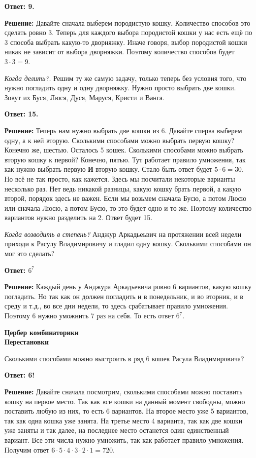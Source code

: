 \textbf{Ответ: 9.}

\textbf{Решение:} Давайте сначала выберем породистую кошку. Количество способов это сделать ровно 3. Теперь для каждого выбора породистой кошки у нас есть ещё по 3 способа выбрать какую-то дворняжку. Иначе говоря, выбор породистой кошки никак не зависит от выбора дворняжки. Поэтому количество способов будет $3\cdot 3=9$. 

\textit{Когда делить?.} Решим ту же самую задачу, только теперь без условия того, что нужно погладить одну и одну дворняжку. Нужно просто выбрать две кошки. Зовут их Буся, Люся, Дуся, Маруся, Кристи и Ванга.

\textbf{Ответ: 15.}

\textbf{Решение:} Теперь нам нужно выбрать две кошки из 6. Давайте сперва выберем одну, а к ней вторую. Сколькими способами можно выбрать первую кошку? Конечно же, шестью. Осталось 5 кошек. Сколькими способами можно выбрать вторую кошку к первой? Конечно, пятью. Тут работает правило умножения, так как нужно выбрать первую \textbf{И} вторую кошку. Стало быть ответ будет $5 \cdot 6 = 30$. Но всё не так просто, как кажется. Здесь мы посчитали некоторые варианты несколько раз. Нет ведь никакой разницы, какую кошку брать первой, а какую второй, порядок здесь не важен. Если мы возьмем сначала Бусю, а потом Люсю или сначала Люсю, а потом Бусю, то это будет одно и то же. Поэтому количество вариантов нужно разделить на 2. Ответ будет 15.

\textit{Когда возводить в степень?} Анджур Аркадьеьвич на протяжении всей недели приходи к Расулу Владимировичу и гладил одну кошку. Сколькими способами он мог это сделать? 

\textbf{Ответ: $6^7$}

\textbf{Решение:} Каждый день у Анджура Аркадьевича ровно 6 вариантов, какую кошку погладить. Но так как он должен погладить и в понедельник, и во вторник, и в среду и т.д., во все дни недели, то здесь срабатывает правило умножения. Поэтому 6 нужно уможнить 7 раз на себя. То есть ответ $6^7$.
\newpage

\textbf{\Large Цербер комбинаторики}\\

\textbf{\large Перестановки}

Сколькими способами можно выстроить в ряд 6 кошек Расула Владимировича?

\textbf{Ответ: 6!}

\textbf{Решение:} Давайте сначала посмотрим, сколькими способами можно поставить кошку на первое место. Так как все кошки на данный момент свободны, можно поставить любую из них, то есть 6 вариантов. На второе место уже 5 вариантов, так как одна кошка уже занята. На третье место 4 варианта, так как две кошки уже заняты и так далее, на последнее место останется один единственный вариант. Все эти числа нужно умножить, так как работает правило умножения. Получим ответ $6\cdot 5 \cdot 4 \cdot 3 \cdot 2 \cdot 1 = 720$.

